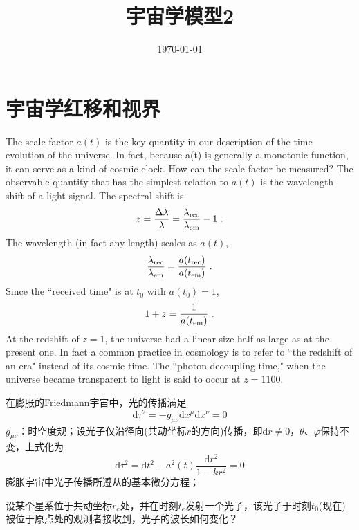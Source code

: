 \documentclass[12pt,a4paper]{article}
\title{宇宙学模型2}
\author{}
\date{\today}
\newcommand{\dif}{\mathrm{d}}
\begin{document}
\maketitle


\section{宇宙学红移和视界}
\cite{cheng2005relativity} The scale factor $a(t)$ is the key quantity in our description of the time evolution of the universe. In fact, because a(t) is generally a monotonic function, it can serve as a kind of cosmic clock. How can the scale factor be measured? The observable quantity that has the simplest relation to $a(t)$ is the wavelength shift of a light signal. The spectral shift is
\begin{equation}
z = \dfrac{\Delta \lambda}{\lambda} = \dfrac{\lambda_{\rm rec}}{\lambda_{\rm em}} - 1~.
\end{equation}
The wavelength (in fact any length) scales as $a(t)$, 
\begin{equation}
 \dfrac{\lambda_{\rm rec}}{\lambda_{\rm em}} =  \dfrac{ a(t_{\rm rec}) }{ a(t_{\rm em})} ~.
\end{equation}
Since the ``received time" is at $t_0$ with $a(t_0) = 1$, 
\begin{equation}
1+z = \dfrac{1}{a(t_{\rm em})} ~.
\end{equation}
At the redshift of $z = 1$, the universe had a linear size half as large as at the present one. In fact a common practice in cosmology is to refer to ``the redshift of an era" instead of its cosmic time. The ``photon decoupling time," when the universe became transparent to light is said to occur at $z = 1100$.






\cite{2010宇宙大尺度结构的形成, 2012宇宙大尺度结构的形成} 在膨胀的Friedmann宇宙中，光的传播满足
\begin{equation}
\dif \tau^2 = -g_{\mu\nu} \dif x^{\mu} \dif x^{\nu} = 0
\end{equation}
$g_{\mu\nu}$：时空度规；设光子仅沿径向(共动坐标$r$的方向)传播，即$\dif r \neq 0$，$\theta$、$\varphi$保持不变，上式化为
\begin{equation}
\dif \tau^2 = \dif t^2 -a^2(t) \frac{\dif r^2}{1-kr^2} = 0
\end{equation}
膨胀宇宙中光子传播所遵从的基本微分方程；

设某个星系位于共动坐标$r_e$处，并在时刻$t_e$发射一个光子，该光子于时刻$t_0$(现在)被位于原点处的观测者接收到，光子的波长如何变化？
\end{document}
